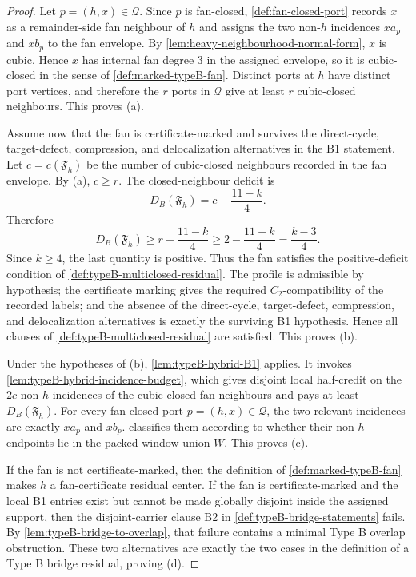 \documentclass[11pt]{article}
\begin{document}
\begin{proof}
Let \(p=(h,x)\in\mathcal Q\).  Since \(p\) is fan-closed,
\cref{def:fan-closed-port} records \(x\) as a remainder-side fan neighbour of
\(h\) and assigns the two non-\(h\) incidences \(xa_p\) and \(xb_p\) to the fan
envelope.  By \cref{lem:heavy-neighbourhood-normal-form}, \(x\) is cubic.
Hence \(x\) has internal fan degree \(3\) in the assigned envelope, so it is
cubic-closed in the sense of \cref{def:marked-typeB-fan}.  Distinct ports at
\(h\) have distinct port vertices, and therefore the \(r\) ports in
\(\mathcal Q\) give at least \(r\) cubic-closed neighbours.  This proves (a).

Assume now that the fan is certificate-marked and survives the direct-cycle,
target-defect, compression, and delocalization alternatives in the B1 statement.
Let \(c=c(\mathfrak F_h)\) be the number of cubic-closed neighbours recorded in
the fan envelope.  By (a), \(c\ge r\).  The closed-neighbour deficit is
\[
D_B(\mathfrak F_h)=c-\frac{11-k}{4}.
\]
Therefore
\[
D_B(\mathfrak F_h)
\ge
r-\frac{11-k}{4}
\ge
2-\frac{11-k}{4}
=
\frac{k-3}{4}.
\]
Since \(k\ge4\), the last quantity is positive.  Thus the fan satisfies the
positive-deficit condition of \cref{def:typeB-multiclosed-residual}.  The
profile is admissible by hypothesis; the certificate marking gives the required
\(C_2\)-compatibility of the recorded labels; and the absence of the
direct-cycle, target-defect, compression, and delocalization alternatives is
exactly the surviving B1 hypothesis.  Hence all clauses of
\cref{def:typeB-multiclosed-residual} are satisfied.  This proves (b).

Under the hypotheses of (b), \cref{lem:typeB-hybrid-B1} applies.  It invokes
\cref{lem:typeB-hybrid-incidence-budget}, which gives disjoint local half-credit
on the \(2c\) non-\(h\) incidences of the cubic-closed fan neighbours and pays
at least \(D_B(\mathfrak F_h)\).  For every fan-closed port
\(p=(h,x)\in\mathcal Q\), the two relevant incidences are exactly \(xa_p\) and
\(xb_p\).   classifies them according
to whether their non-\(h\) endpoints lie in the packed-window union \(W\).  This
proves (c).

If the fan is not certificate-marked, then the definition of
\cref{def:marked-typeB-fan} makes \(h\) a fan-certificate residual center.  If
the fan is certificate-marked and the local B1 entries exist but cannot be made
globally disjoint inside the assigned support, then the disjoint-carrier clause
B2 in \cref{def:typeB-bridge-statements} fails.  By
\cref{lem:typeB-bridge-to-overlap}, that failure contains a minimal Type B
overlap obstruction.  These two alternatives are exactly the two cases in the
definition of a Type B bridge residual, proving (d).
\end{proof}
\end{document}
